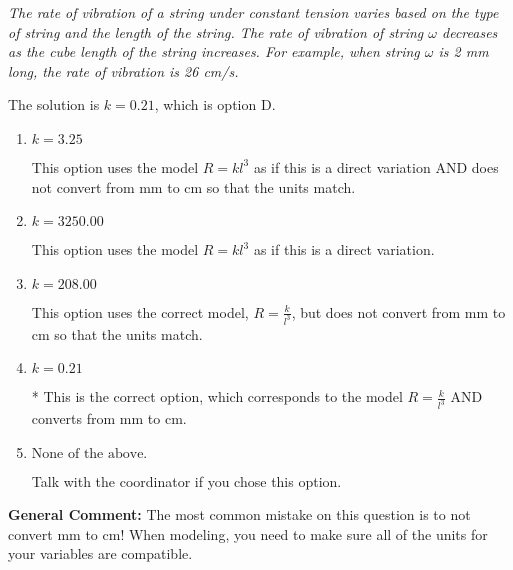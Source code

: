 \documentclass{extbook}[14pt]
\begin{document}
\begin{enumerate}
{\begin{center}
    \textit{ The rate of vibration of a string under constant tension varies based on the type of string and the length of the string. The rate of vibration of string $\omega$ decreases as the cube length of the string increases. For example, when string $\omega$ is 2 mm long, the rate of vibration is 26 cm/s. }
\end{center}
The solution is \( k = 0.21 \), which is option D.\begin{enumerate}[label=\Alph*.]
\item \( k = 3.25 \)

This option uses the model $R = kl^{3}$ as if this is a direct variation AND does not convert from mm to cm so that the units match.
\item \( k = 3250.00 \)

This option uses the model $R = kl^{3}$ as if this is a direct variation.
\item \( k = 208.00 \)

This option uses the correct model, $R = \frac{k}{l^{3}}$, but does not convert from mm to cm so that the units match.
\item \( k = 0.21 \)

* This is the correct option, which corresponds to the model $R = \frac{k}{l^{3}}$ AND converts from mm to cm.
\item \( \text{None of the above.} \)

Talk with the coordinator if you chose this option.
\end{enumerate}

\textbf{General Comment:} The most common mistake on this question is to not convert mm to cm! When modeling, you need to make sure all of the units for your variables are compatible.
}
\end{enumerate}
\end{document}
